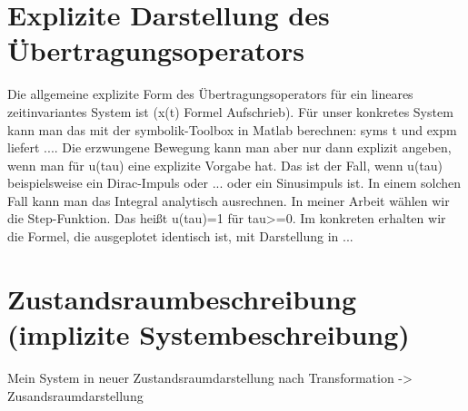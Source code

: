 \documentclass[
  ngerman
  ,12pt
  ,pdftex
]{article}
\begin{document}


\section{Explizite Darstellung des Übertragungsoperators} %
Die allgemeine explizite Form des Übertragungsoperators für ein lineares zeitinvariantes System ist (x(t) Formel Aufschrieb).
Für unser konkretes System kann man das mit der symbolik-Toolbox in Matlab berechnen: syms t und expm liefert ....
Die erzwungene Bewegung kann man aber nur dann explizit angeben, wenn man für u(tau) eine explizite Vorgabe hat. Das ist der Fall, wenn u(tau) beispielsweise ein Dirac-Impuls oder ... oder ein Sinusimpuls ist. In einem solchen Fall kann man das Integral analytisch ausrechnen. In meiner Arbeit wählen wir die Step-Funktion. Das heißt u(tau)=1 für tau>=0. Im konkreten erhalten wir die Formel, die ausgeplotet identisch ist, mit Darstellung in ...

\section{Zustandsraumbeschreibung (implizite Systembeschreibung)}
Mein System in neuer Zustandsraumdarstellung nach Transformation
-> Zusandsraumdarstellung






\end{document}
